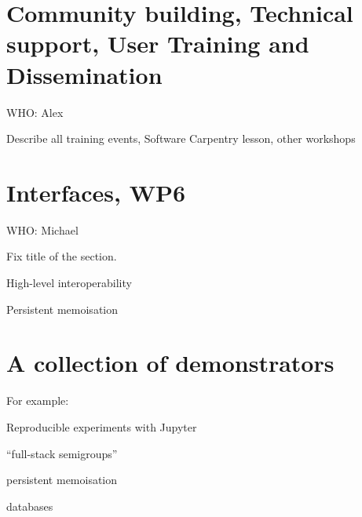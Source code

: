 \documentclass{deliverablereport}
\begin{document}
\section{Community building, Technical support, User Training and Dissemination}\label{gap-support}

WHO: Alex

Describe all training events, Software Carpentry lesson, other workshops

\section{Interfaces, WP6}

WHO: Michael

Fix title of the section.

High-level interoperability

Persistent memoisation

\section{A collection of demonstrators}\label{demos}

For example:

Reproducible experiments with Jupyter

``full-stack semigroups''

persistent memoisation

databases

\end{document}
